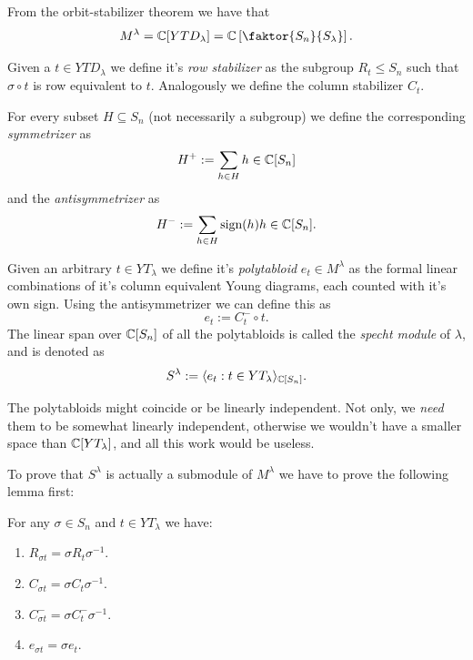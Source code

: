 \documentclass[11pt]{scrartcl}
\begin{document}
	\begin{remark}
		From the orbit-stabilizer theorem we have that
		$$M^\lambda=\CC[YTD_\lambda]=\CC\left[\faktor{S_n}{S_\lambda}\right].$$
	\end{remark}
	\begin{definition}
		Given a $t\in YTD_\lambda$ we define it's \textit{row stabilizer} as the subgroup $R_t\le S_n$ such that $\sigma \circ t$ is row equivalent to $t$. Analogously we define the column stabilizer $C_t$.
	\end{definition}
	\begin{definition}
		For every subset $H\subseteq S_n$ (not necessarily a subgroup) we define the corresponding \textit{symmetrizer} as 
		$$H^+:=\sum_{h\in H}h\in \mathbb C[S_n]$$
		and the \textit{antisymmetrizer} as
		$$H^-:=\sum_{h\in H}\text{sign}(h)h\in \mathbb C[S_n].$$
	\end{definition}
	\begin{definition}
		Given an arbitrary $t\in YT_\lambda$ we define it's \textit{polytabloid} $e_t\in M^\lambda$ as the formal linear combinations of it's column equivalent Young diagrams, each counted with it's own sign. Using the antisymmetrizer we can define this as
		$$e_t:=C_t^-\circ t.$$
		The linear span over $\mathbb C[S_n]$ of all the polytabloids is called the \textit{specht module} of $\lambda$, and is denoted as
		$$S^\lambda:=\langle e_t:t\in YT_\lambda \rangle_{\mathbb C[S_n]}.$$
	\end{definition}
	\begin{remark}
		The polytabloids might coincide or be linearly independent. Not only, we \textit{need} them to be somewhat linearly independent, otherwise we wouldn't have a smaller space than $\mathbb C[YT_\lambda]$, and all this work would be useless.
	\end{remark}
	To prove that $S^\lambda$ is actually a submodule of $M^\lambda$ we have to prove the following lemma first:
	\begin{lemma}
		For any $\sigma\in S_n$ and $t\in YT_\lambda$ we have:
		\begin{enumerate}
			\item $R_{\sigma t}=\sigma R_t\sigma^{-1}$. 
			\item $C_{\sigma t}=\sigma C_t\sigma^{-1}$.
			\item $C^-_{\sigma t}=\sigma C^-_{t}\sigma^{-1}$.
			\item $e_{\sigma t}=\sigma e_t$.
		\end{enumerate}
	\end{lemma}
\end{document}
